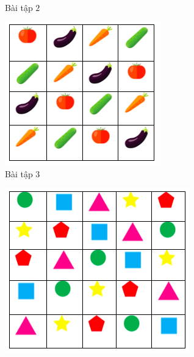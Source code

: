 \begin{multicols}{2}
\begin{figure}[H]
		\caption{\small{Bài tập $2$}}
		\vspace*{-10pt}
	\end{figure}
	\begin{figure}[H]
		\centering
		\vspace*{-5pt}
		\captionsetup{labelformat= empty, justification=centering}
		\includegraphics[width=0.9\linewidth]{sudoku3}
		\caption{\small{Bài tập $3$}}
		\vspace*{-10pt}
	\end{figure}
	\begin{figure}[H]
		\centering
		\vspace*{-5pt}
		\captionsetup{labelformat= empty, justification=centering}
		\includegraphics[width=0.9\linewidth]{sudoku4}

\end{figure}
\end{multicols}
